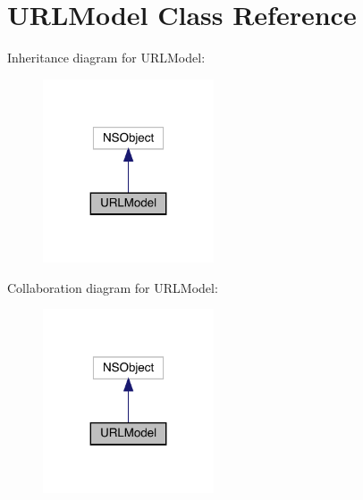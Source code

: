 \hypertarget{interface_u_r_l_model}{}\section{U\+R\+L\+Model Class Reference}
\label{interface_u_r_l_model}


Inheritance diagram for U\+R\+L\+Model\+:\nopagebreak
\begin{figure}[H]
\begin{center}
\leavevmode
\includegraphics[width=143pt]{interface_u_r_l_model__inherit__graph}
\end{center}
\end{figure}


Collaboration diagram for U\+R\+L\+Model\+:\nopagebreak
\begin{figure}[H]
\begin{center}
\leavevmode
\includegraphics[width=143pt]{interface_u_r_l_model__coll__graph}
\end{center}
\end{figure}
